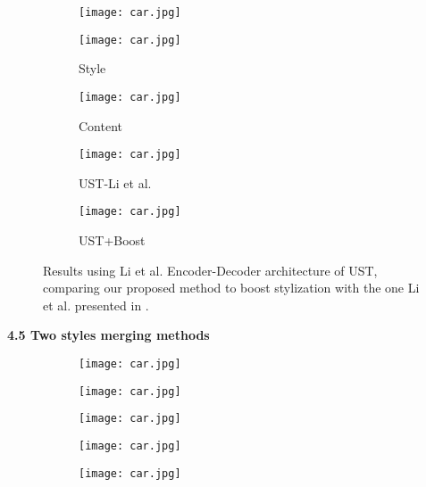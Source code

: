 \begin{flushleft}
\begin{flushleft}
\begin{figure}[h!]
	\begin{subfigure}[b]{0.225\linewidth}
		\texttt{[image: car.jpg]} %
	\end{subfigure}
	\centering
	\begin{subfigure}[b]{0.225\linewidth}
		\texttt{[image: car.jpg]} %
		\caption{Style}
	\end{subfigure}
	\begin{subfigure}[b]{0.225\linewidth}
		\texttt{[image: car.jpg]} %
		\caption{Content}
	\end{subfigure}
	\begin{subfigure}[b]{0.225\linewidth}
		\texttt{[image: car.jpg]} %
		\caption{UST-Li et al. \cite{bib11}}
	\end{subfigure}
	\begin{subfigure}[b]{0.225\linewidth}
		\texttt{[image: car.jpg]} %
		\caption{UST+Boost}
	\end{subfigure}
	\caption{Results using Li et al. \cite{bib11} Encoder-Decoder architecture of UST, comparing our proposed method to boost stylization with the one Li et al. presented in \cite{bib11}.}
	\label{fig:Boost}
\end{figure}
\begin{flushleft}
	\textbf{4.5 Two styles merging methods}\newline
\end{flushleft}
\begin{figure}[h!]
	\centering
	\begin{subfigure}[b]{0.16\linewidth}
		\texttt{[image: car.jpg]} %
	\end{subfigure}
	\begin{subfigure}[b]{0.16\linewidth}
		\texttt{[image: car.jpg]} %
	\end{subfigure}
	\begin{subfigure}[b]{0.16\linewidth}
		\texttt{[image: car.jpg]} %
	\end{subfigure}
	\begin{subfigure}[b]{0.16\linewidth}
		\texttt{[image: car.jpg]} %
	\end{subfigure}
	\begin{subfigure}[b]{0.16\linewidth}
		\texttt{[image: car.jpg]} %

\end{subfigure}
\end{figure}
\end{flushleft}
\end{flushleft}
